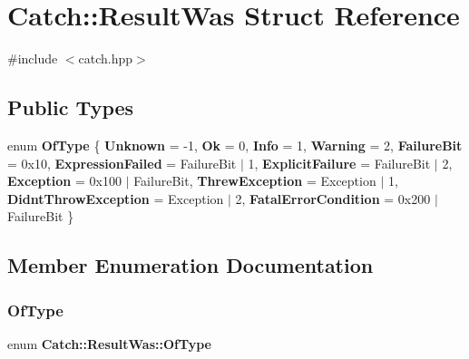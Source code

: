 \section{Catch\+:\+:Result\+Was Struct Reference}
\label{struct_catch_1_1_result_was}


{\ttfamily \#include $<$catch.\+hpp$>$}

\subsection*{Public Types}
\begin{DoxyCompactItemize}
\item 
enum \textbf{ Of\+Type} \{ \newline
\textbf{ Unknown} = -\/1, 
\textbf{ Ok} = 0, 
\textbf{ Info} = 1, 
\textbf{ Warning} = 2, 
\newline
\textbf{ Failure\+Bit} = 0x10, 
\textbf{ Expression\+Failed} = Failure\+Bit $\vert$ 1, 
\textbf{ Explicit\+Failure} = Failure\+Bit $\vert$ 2, 
\textbf{ Exception} = 0x100 $\vert$ Failure\+Bit, 
\newline
\textbf{ Threw\+Exception} = Exception $\vert$ 1, 
\textbf{ Didnt\+Throw\+Exception} = Exception $\vert$ 2, 
\textbf{ Fatal\+Error\+Condition} = 0x200 $\vert$ Failure\+Bit
 \}
\end{DoxyCompactItemize}


\subsection{Member Enumeration Documentation}
\mbox{\label{struct_catch_1_1_result_was_a624e1ee3661fcf6094ceef1f654601ef}} 
\subsubsection{Of\+Type}
{\footnotesize\ttfamily enum \textbf{ Catch\+::\+Result\+Was\+::\+Of\+Type}}

